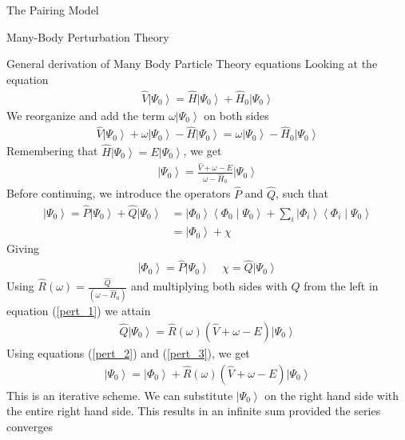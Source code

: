 \documentclass[twoside,english]{uiofysmaster}
\begin{document}
\begin{chapter}{The Pairing Model}
\begin{section}{Many-Body Perturbation Theory}
 	\begin{subsection}{General derivation of Many Body Particle Theory equations}
 		Looking at the equation
 		\begin{align}
 			\hat V \left| \Psi_0 \right> = \hat H \left| \Psi_0 \right> + \hat H_0 \left| \Psi_0 \right> 
 		\end{align}
 		We reorganize and add the term $\omega \left| \Psi_0 \right>$ on both sides
 		\begin{align}
 			\hat V \left| \Psi_0 \right> + \omega \left| \Psi_0 \right> - \hat H \left| \Psi_0 \right> = \omega \left| \Psi_0 \right> - \hat H_0 \left| \Psi_0 \right> 
 		\end{align}
 		Remembering that $\hat H \left| \Psi_0 \right> = E\left| \Psi_0 \right> $, we get 
 		\begin{align}
 			\left| \Psi_0 \right> = \frac{ \hat V + \omega - E }{\omega - \hat H_0} \left| \Psi_0 \right>
 			\label{pert_1}
 		\end{align}
 		Before continuing, we introduce the operators $\hat P$ and $\hat Q$, such that
 		\begin{align}
 			\left| \Psi_0 \right> = \hat P \left| \Psi_0 \right> + \hat Q \left| \Psi_0 \right> 
 			&= \left| \Phi_0 \right> \left< \Phi_0 \middle| \Psi_0 \right> + \sum_i \left| \Phi_i \right> \left< \Phi_i \middle| \Psi_0 \right> 
 			\label{pert_2} \\
 			&= \left| \Phi_0 \right> + \chi
 		\end{align}
 		Giving
 		\begin{align}
 			\left| \Phi_0 \right> = \hat P \left| \Psi_0 \right> \;\;\;\; \chi = \hat Q \left| \Psi_0 \right> 
 			\label{pert_3}
 		\end{align}
 		Using $\hat R(\omega) = \frac{\hat{Q}}{\left( \omega - \hat H_0 \right)}$ and multiplying both sides with $\hat Q$ from the left in equation (\ref{pert_1}) we attain
 		\begin{align}
 			\hat Q \left| \Psi_0 \right> = \hat R(\omega) \left( \hat V + \omega - E \right) \left| \Psi_0 \right>
 		\end{align}
 		Using equations (\ref{pert_2}) and (\ref{pert_3}), we get
 		\begin{align}
 			\left| \Psi_0 \right> = \left| \Phi_0 \right> + \hat R(\omega) \left( \hat V + \omega - E \right) \left| \Psi_0 \right>
 		\end{align}
 		This is an iterative scheme. We can substitute $\left| \Psi_0 \right>$ on the right hand side with the entire right hand side. This results in an infinite sum provided the series converges

\end{subsection}
\end{section}
\end{chapter}
\end{document}
